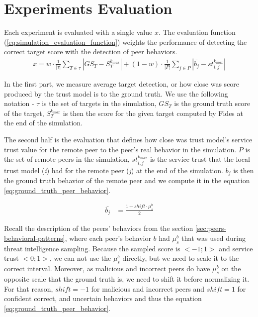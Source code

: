 \section{Experiments Evaluation}
\label{sec:experiments-evaluation}

Each experiment is evaluated with a single value $x$.
The evaluation function (\ref{eq:simulation_evaluation_function}) weights the performance of detecting the correct target score with the detection of peer behaviors.
\begin{equation}
\begin{split}
    x = w \cdot \frac{1}{|\tau|} \sum_{T \in \tau}\left|GS_{T} - S^{k_{max}}_{T} \right| + \left(1 - w\right) \cdot \frac{1}{|P|} \sum_{j \in P}\left|\bar{b_{j}} - st^{k_{max}}_{i, j} \right|
\end{split}
\label{eq:simulation_evaluation_function}
\end{equation}

In the first part, we measure average target detection, or how close was score produced by the trust model is to the ground truth.
We use the following notation - $\tau$ is the set of targets in the simulation, $GS_{T}$ is the ground truth score of the target, $S^{k_{max}}_{T}$ is then the score for the given target computed by Fides at the end of the simulation.

The second half is the evaluation that defines how close was trust model's service trust value for the remote peer to the peer's real behavior in the simulation.
$P$ is the set of remote peers in the simulation, $st^{k_{max}}_{i, j}$ is the service trust that the local trust model (\textit{i}) had for the remote peer (\textit{j}) at the end of the simulation.
$\bar{b_{j}}$ is then the ground truth behavior of the remote peer and we compute it in the equation \ref{eq:ground_truth_peer_behavior}.

\begin{equation}
    \begin{split}
    \bar{b_{j}} &= \frac{1 + shift \cdot \mu^{b}_{s}}{2}
    \end{split}
    \label{eq:ground_truth_peer_behavior}
\end{equation}

Recall the description of the peers' behaviors from the section \ref{sec:peers-behavioral-patterns}, where each peer's behavior $b$ had $\mu^{b}_{s}$ that was used during threat intelligence sampling.
Because the sampled score is $<-1; 1>$ and service trust $<0; 1>$, we can not use the $\mu^{b}_{s}$ directly, but we need to scale it to the correct interval.
Moreover, as malicious and incorrect peers  do have $\mu^{b}_{s}$ on the opposite scale that the ground truth is, we need to shift it before normalizing it.
For that reason, $shift = -1$ for malicious and incorrect peers and $shift = 1$ for confident correct, and uncertain behaviors and thus the equation \ref{eq:ground_truth_peer_behavior}.

